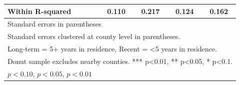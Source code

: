 \begin{table}[htbp]
\begin{tabular}{l*{4}{c}}
Within R-squared&       0.110         &       0.217         &       0.124         &       0.162         \\
\hline\hline
\multicolumn{5}{l}{\footnotesize Standard errors in parentheses}\\
\multicolumn{5}{l}{\footnotesize Standard errors clustered at county level in parentheses.}\\
\multicolumn{5}{l}{\footnotesize Long-term = 5+ years in residence, Recent = <5 years in residence.}\\
\multicolumn{5}{l}{\footnotesize Donut sample excludes nearby counties. *** p<0.01, ** p<0.05, * p<0.1.}\\
\multicolumn{5}{l}{\footnotesize \sym{*} \(p<0.10\), \sym{**} \(p<0.05\), \sym{***} \(p<0.01\)}\\
\end{tabular}
\end{table}
